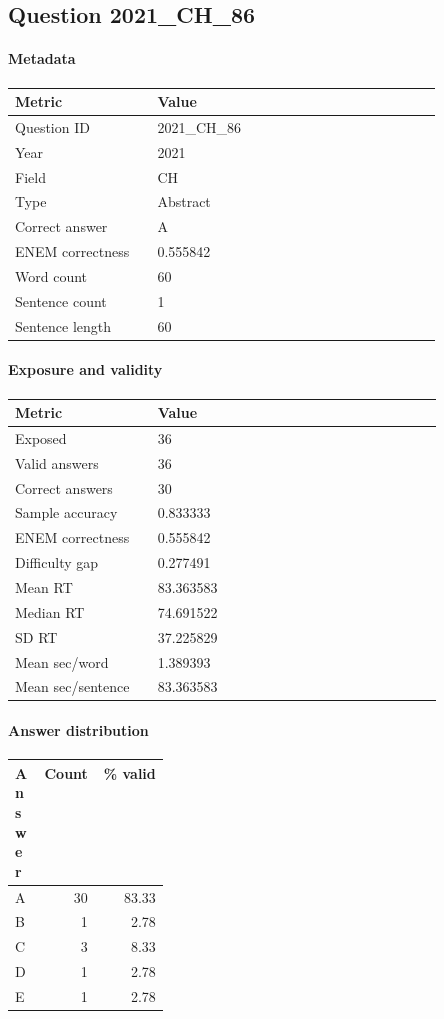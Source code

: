 \subsection*{Question 2021\_CH\_86}
\label{sec:q_2021_CH_86}
\paragraph{Metadata}
\begin{tabular}{p{0.30\linewidth}p{0.60\linewidth}}
\toprule
Metric & Value\\
\midrule
Question ID & 2021\_CH\_86\\
Year & 2021\\
Field & CH\\
Type & Abstract\\
Correct answer & A\\
ENEM correctness & 0.555842\\
Word count & 60\\
Sentence count & 1\\
Sentence length & 60\\
\bottomrule
\end{tabular}

\paragraph{Exposure and validity}
\begin{tabular}{p{0.30\linewidth}p{0.60\linewidth}}
\toprule
Metric & Value\\
\midrule
Exposed & 36\\
Valid answers & 36\\
Correct answers & 30\\
Sample accuracy & 0.833333\\
ENEM correctness & 0.555842\\
Difficulty gap & 0.277491\\
Mean RT & 83.363583\\
Median RT & 74.691522\\
SD RT & 37.225829\\
Mean sec/word & 1.389393\\
Mean sec/sentence & 83.363583\\
\bottomrule
\end{tabular}

\paragraph{Answer distribution}
\begin{tabular}{p{0.18\linewidth}rr}
\toprule
Answer & Count & \% valid\\
\midrule
A & 30 & 83.33\\
B & 1 & 2.78\\
C & 3 & 8.33\\
D & 1 & 2.78\\
E & 1 & 2.78\\
\bottomrule
\end{tabular}

